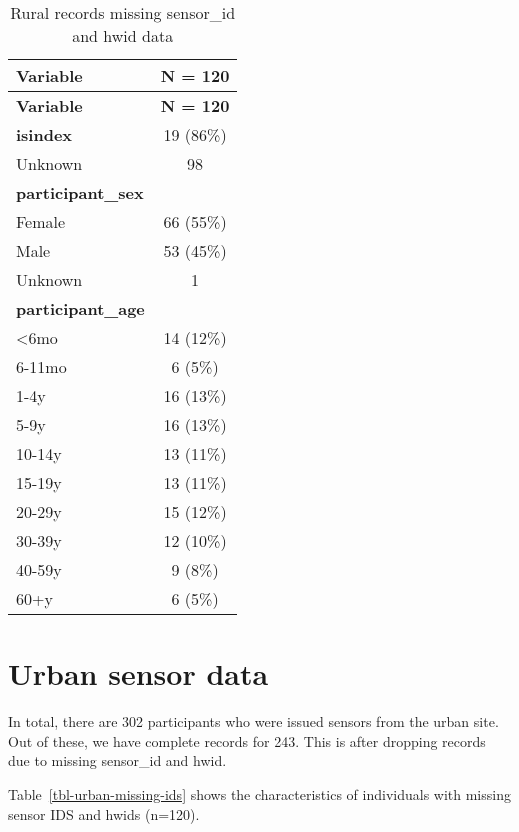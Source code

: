 \documentclass[
  letterpaper,
  DIV=11,
  numbers=noendperiod]{scrartcl}
\begin{document}
\hypertarget{tbl-rural-missing-ids}{}
\begin{longtable}[]{@{}lc@{}}
\caption{\label{tbl-rural-missing-ids}Rural records missing sensor\_id
and hwid data}\tabularnewline
\toprule()
\textbf{Variable} & \textbf{N = 120} \\
\midrule()
\endfirsthead
\toprule()
\textbf{Variable} & \textbf{N = 120} \\
\midrule()
\endhead
\textbf{isindex} & 19 (86\%) \\
Unknown & 98 \\
\textbf{participant\_sex} & \\
Female & 66 (55\%) \\
Male & 53 (45\%) \\
Unknown & 1 \\
\textbf{participant\_age} & \\
\textless6mo & 14 (12\%) \\
6-11mo & 6 (5\%) \\
1-4y & 16 (13\%) \\
5-9y & 16 (13\%) \\
10-14y & 13 (11\%) \\
15-19y & 13 (11\%) \\
20-29y & 15 (12\%) \\
30-39y & 12 (10\%) \\
40-59y & 9 (8\%) \\
60+y & 6 (5\%) \\
\bottomrule()
\end{longtable}

\hypertarget{urban-sensor-data}{%
\section{Urban sensor data}\label{urban-sensor-data}}

In total, there are 302 participants who were issued sensors from the
urban site. Out of these, we have complete records for 243. This is
after dropping records due to missing sensor\_id and hwid.

Table~\ref{tbl-urban-missing-ids} shows the characteristics of
individuals with missing sensor IDS and hwids (n=120).
\end{document}
